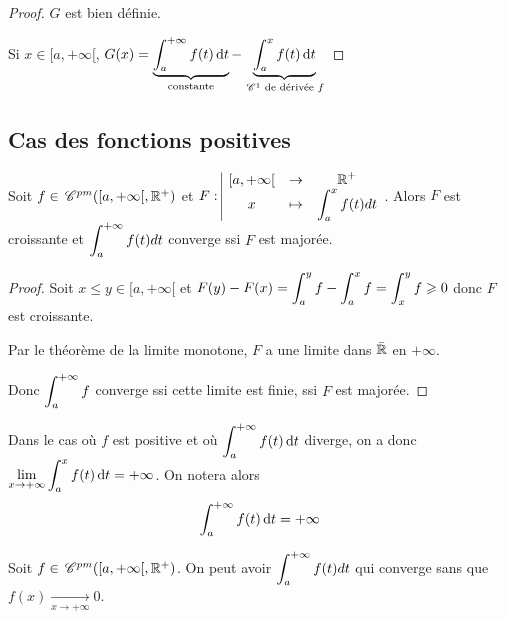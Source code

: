 \begin{proof}
    $G$ est bien définie. 

    Si $x \in [a, + \infty[$, $G(x) = \displaystyle \underbrace{\int_{a}^{+ \infty } f(t) \,\mathrm{d}t}_{\text{constante}} - \underbrace{\int_a^x f(t) \,\mathrm{d}t}_{\,\mathscr C^{1} \text{ de dérivée } f}$
\end{proof}

\subsection{Cas des fonctions positives}

\begin{proposition}{}{}
    Soit $f \in \,\mathscr C^{pm}([a, + \infty[, \mathbb{R}^+)$ et $F: \space \begin{array}{|ccc} \displaystyle [a, + \infty[ & \to & \displaystyle \mathbb{R}^+ \\ \displaystyle x & \mapsto & \displaystyle \int_a^x f(t) dt \end{array}$.
    Alors $F$ est croissante et $\displaystyle \int_a^{+ \infty} f(t) dt$ converge ssi $F$ est majorée.
\end{proposition}

\begin{proof}
    Soit $x \leqslant y \in [a, +\infty[$ et $F(y) - F(x) = \displaystyle \int_a^y f - \int_a^x f = \int_x^y f \geqslant 0$ donc $F$ est croissante.

    Par le théorème de la limite monotone, $F$ a une limite dans $\bar {\mathbb{R}}$ en $+\infty$.

    Donc $\displaystyle \int_{a }^{+\infty   } f$ converge ssi cette limite est finie, ssi $F$ est majorée.
\end{proof}

\begin{remarque}
    Dans le cas où $f$ est positive et où $\displaystyle \int_{a }^{+ \infty   } f(t) \,\mathrm{d}t$ diverge, on a 
    donc $\displaystyle \lim_{x \to + \infty   } \int_{a }^{x } f(t) \,\mathrm{d}t = + \infty$.
    On notera alors 
    $$\int_{a }^{+ \infty   } f(t) \,\mathrm{d}t = + \infty$$
\end{remarque}



\begin{proposition}{}{}
    Soit $f \in \,\mathscr C^{pm}([a, + \infty[, \mathbb{R}^+)$. On peut avoir $\displaystyle \int_a^{+ \infty} f(t) dt$ 
    qui converge sans que $f(x) \xrightarrow[x \to + \infty   ]{} 0$.
\end{proposition}

